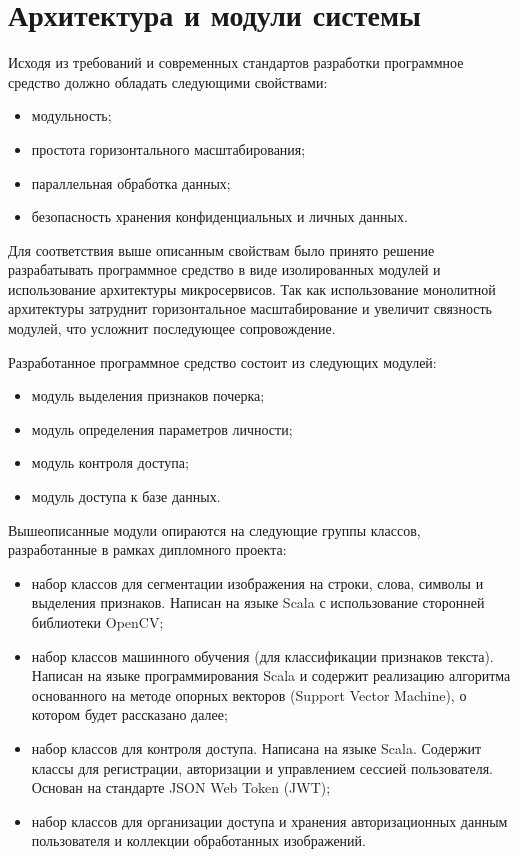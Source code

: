 \section{Архитектура и модули системы}

Исходя из требований и современных стандартов разработки программное средство должно обладать следующими свойствами:
\begin{itemize}
    \item модульность;
    \item простота горизонтального масштабирования;
    \item параллельная обработка данных;
    \item безопасность хранения конфиденциальных и личных данных.
\end{itemize}

Для соответствия выше описанным свойствам было принято решение разрабатывать программное средство в виде изолированных модулей и использование архитектуры микросервисов. Так как использование монолитной архитектуры затруднит горизонтальное масштабирование и увеличит связность модулей, что усложнит последующее сопровождение. 

Разработанное программное средство состоит из следующих модулей:
\begin{itemize}
    \item модуль выделения признаков почерка;
    \item модуль определения параметров личности;
    \item модуль контроля доступа;
    \item модуль доступа к базе данных.
\end{itemize}

Вышеописанные модули опираются на следующие группы классов, разработанные в рамках дипломного проекта:
\begin{itemize}
    \item набор классов для сегментации изображения на строки, слова, символы и выделения признаков. Написан на языке Scala с использование сторонней библиотеки OpenCV;
    \item набор классов машинного обучения (для классификации признаков текста). Написан на языке программирования Scala и содержит реализацию алгоритма основанного на методе опорных векторов (Support Vector Machine), о котором будет рассказано далее;
    \item набор классов для контроля доступа. Написана на языке Scala. Содержит классы для регистрации, авторизации и управлением сессией пользователя. Основан на стандарте JSON Web Token (JWT);
    \item набор классов для организации доступа и хранения авторизационных данным пользователя и коллекции обработанных изображений.
\end{itemize}

